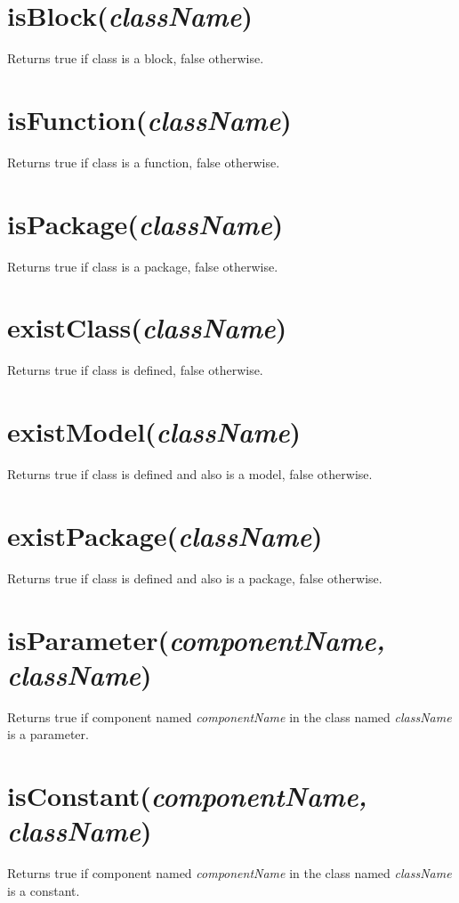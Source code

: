 \documentclass{report}
\newcommand{\func}[1]{\section{#1}}
\newcommand{\funcend}{}
\begin{document}
\func{isBlock(\emph{className})}
Returns true if class is a block, false otherwise.

\func{isFunction(\emph{className})}
Returns true if class is a function, false otherwise.

\func{isPackage(\emph{className})}
Returns true if class is a package, false otherwise.

\func{existClass(\emph{className})}
Returns true if class is defined, false otherwise.

\func{existModel(\emph{className})}
Returns true if class is defined and also is a model, false otherwise.

\func{existPackage(\emph{className})}
Returns true if class is defined and also is a package, false otherwise.

\func{isParameter(\emph{componentName, className})}
Returns true if component named \emph{componentName} in the class
named \emph{className} is a parameter.

\func{isConstant(\emph{componentName, className})}
Returns true if component named \emph{componentName} in the class
named \emph{className} is a constant.

\funcend
\end{document}
